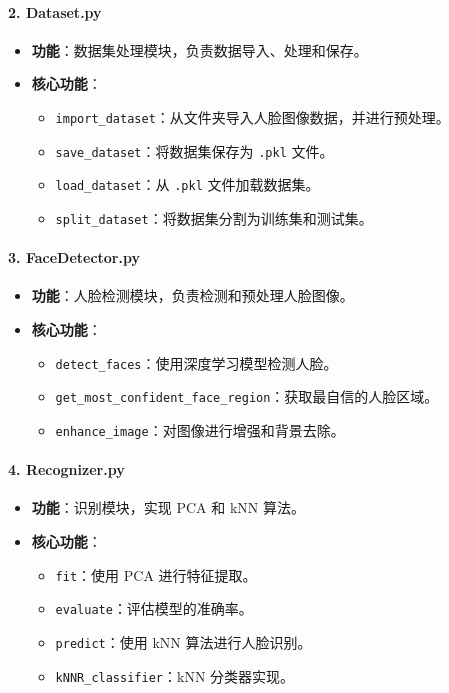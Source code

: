 \documentclass{article}
\begin{document}
\paragraph{2. Dataset.py}
\begin{itemize}
    \item \textbf{功能}：数据集处理模块，负责数据导入、处理和保存。
    \item \textbf{核心功能}：
    \begin{itemize}
        \item \texttt{import\_dataset}：从文件夹导入人脸图像数据，并进行预处理。
        \item \texttt{save\_dataset}：将数据集保存为 \texttt{.pkl} 文件。
        \item \texttt{load\_dataset}：从 \texttt{.pkl} 文件加载数据集。
        \item \texttt{split\_dataset}：将数据集分割为训练集和测试集。
    \end{itemize}
\end{itemize}

\paragraph{3. FaceDetector.py}
\begin{itemize}
    \item \textbf{功能}：人脸检测模块，负责检测和预处理人脸图像。
    \item \textbf{核心功能}：
    \begin{itemize}
        \item \texttt{detect\_faces}：使用深度学习模型检测人脸。
        \item \texttt{get\_most\_confident\_face\_region}：获取最自信的人脸区域。
        \item \texttt{enhance\_image}：对图像进行增强和背景去除。
    \end{itemize}
\end{itemize}

\paragraph{4. Recognizer.py}
\begin{itemize}
    \item \textbf{功能}：识别模块，实现 PCA 和 kNN 算法。
    \item \textbf{核心功能}：
    \begin{itemize}
        \item \texttt{fit}：使用 PCA 进行特征提取。
        \item \texttt{evaluate}：评估模型的准确率。
        \item \texttt{predict}：使用 kNN 算法进行人脸识别。
        \item \texttt{kNNR\_classifier}：kNN 分类器实现。
    \end{itemize}
\end{itemize}
\end{document}
